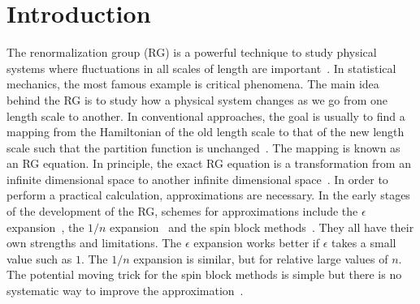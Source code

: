 \documentclass[aps,prb,reprint,superscriptaddress,floatfix]{revtex4-2}
\begin{document}

\maketitle

\section{Introduction\label{intro}}
The renormalization group (RG) is a powerful technique to study physical
systems where fluctuations in all scales of length are
important~\cite{wilsonNobel}. In statistical mechanics, the most famous
example is critical phenomena.  The main idea behind the RG is to study
how a physical system changes as we go from one length scale to another.
In conventional approaches, the goal is usually to find a mapping from
the Hamiltonian of the old length scale to that of the new length scale
such that the partition function is unchanged~\cite{nonlinearRG}. The
mapping is known as an RG equation. In principle, the exact RG equation
is a transformation from an infinite dimensional space to another
infinite dimensional space~\cite{wilsonNobel,wilson1970a}. In order to
perform a practical calculation, approximations are necessary. In the
early stages of the development of the RG, schemes for approximations
include the $\epsilon$ expansion~\cite{wilson1972}, the $1/n$
expansion~\cite{largeNexp} and the spin block
methods~\cite{kadanoff1966,kadanoff1975,migdal,kadanoff1976,niemeijer1973}.
They all have their own strengths and limitations. The $\epsilon$
expansion works better if $\epsilon$ takes a small value such as $1$.
The $1/n$ expansion is similar, but for relative large values of $n$.
The potential moving trick for the spin block methods is simple but
there is no systematic way to improve the
approximation~\cite{kardar2007}.
%
\end{document}
